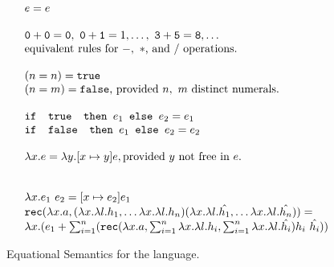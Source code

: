 \begin{figure}
\[
\begin{array}{lr}
e = e \\ \\
\texttt{0} + \texttt{0} = \texttt{0}, \ \texttt{0} + \texttt{1} = 1, \ldots, \ \texttt{3} + \texttt{5} = \texttt{8}, \ldots  \\
\text{equivalent rules for } -, \ * \text{, and } /\text{ operations.}
\\ \\
(n =n) = \texttt{true} \\ (n=m) = \texttt{false}\text{, provided } n, \ m \text{ distinct numerals.}\\ \\ 
\ifelse{\texttt{ true }}{e_1}{e_2} = e_1 \\
\ifelse{\texttt{ false }}{e_1}{e_2} = e_2 \\ \\ 
\lambda x.e = \lambda y.[x \mapsto y]e, \text{provided } y \text{ not free in } e. \\ \\ \\
\lambda x.e_1 \ e_2 = [x \mapsto e_2]e_1 \\
\texttt{rec}(\lambda x.a, ( \lambda x.\lambda l.h_1, \ldots \lambda x.\lambda l.h_n)
( \lambda x.\lambda l.\hat{h_1}, \ldots \lambda x.\lambda l.\hat{h_n}))= \\
\lambda x.(e_1 + \sum_{i=1}^n(\texttt{rec}(\lambda x.a, \sum_{i=1}^n \lambda x.\lambda l.h_i, 
\sum_{i=1}^n \lambda x.\lambda l.\hat{h_i}) h_i  \ \hat{h_i}))
\end{array}
\]
\caption{Equational Semantics for the language.}
\label{fig:typing}
\end{figure}

